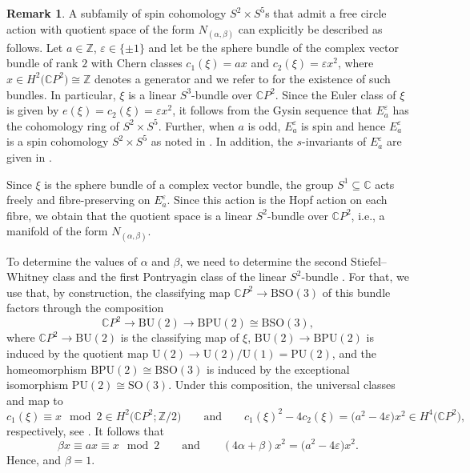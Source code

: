 \documentclass[10pt,a4paper]{amsart}
\numberwithin{equation}{section}
\theoremstyle{definition}
\newtheorem{Remark}[Theorem]{Remark}
\numberwithin{table}{section}
\newcommand{\Z}{\mathbb{Z}}
\newcommand{\C}{\mathbb{C}}
\begin{document}
\begin{Remark}
	A subfamily of spin cohomology $S^2\times S^5$s that admit a free circle action with quotient space of the form $N_{(\alpha,\beta)}$ can explicitly be described as follows. Let $a\in\Z$, $\varepsilon\in\{\pm1\}$ and let \smash{$E_a^\varepsilon\xrightarrow{\xi}\C P^2$} be the sphere bundle of the complex vector bundle of rank $2$ with Chern classes $c_1(\xi)=a x$ and $c_2(\xi)=\varepsilon x^2$, where $x\in H^2\bigl(\C P^2\bigr)\cong\Z$ denotes a generator and we refer to \cite[Theorem A]{Th74} for the existence of such bundles. In particular, $\xi$ is a linear $S^3$-bundle over $\C P^2$. Since the Euler class of $\xi$ is given by $e(\xi)=c_2(\xi)=\varepsilon x^2$, it follows from the Gysin sequence that $E_a^\varepsilon$ has the cohomology ring of $S^2\times S^5$. Further, when $a$ is odd, $E_a^\varepsilon$ is spin and hence $E_a^\varepsilon$ is a spin cohomology $S^2\times S^5$ as noted in \cite[Section 5]{KS25}. In addition, the $s$-invariants of $E_a^\varepsilon$ are given in \cite[(5.4)]{KS25}.
	
	Since $\xi$ is the sphere bundle of a complex vector bundle, the group $S^1\subseteq\C$ acts freely and fibre-preserving on $E_a^\varepsilon$. Since this action is the Hopf action on each fibre, we obtain that the quotient space is a linear $S^2$-bundle over $\C P^2$, i.e., a manifold of the form $N_{(\alpha,\beta)}$.
	
	To determine the values of $\alpha$ and $\beta$, we need to determine the second Stiefel--Whitney class and the first Pontryagin class of the linear $S^2$-bundle \smash{$N_{(\alpha,\beta)}\to\C P^2$}. For that, we use that, by construction, the classifying map $\C P^2\to\mathrm{BSO}(3)$ of this bundle factors through the composition
	\[ \C P^2\to\mathrm{BU}(2)\to\mathrm{BPU}(2)\cong\mathrm{BSO}(3), \]
	where $\C P^2\to\mathrm{BU}(2)$ is the classifying map of $\xi$, $\mathrm{BU}(2)\to\mathrm{BPU}(2)$ is induced by the quotient map $\mathrm{U}(2)\to\mathrm{U}(2)/\mathrm{U}(1)=\mathrm{PU}(2)$, and the homeomorphism $\mathrm{BPU}(2)\cong\mathrm{BSO}(3)$ is induced by the exceptional isomorphism $\mathrm{PU}(2)\cong\mathrm{SO}(3)$. Under this composition, the universal classes \smash{$w_2\in H^2(\mathrm{BSO}(3);\Z/2)$} and  map to
	\[c_1(\xi)\equiv x\mod 2\in H^2\bigl(\C P^2;\Z/2\bigr)\qquad
\text{and}\qquad c_1(\xi)^2-4c_2(\xi)= \bigl(a^2-4\varepsilon\bigr)x^2\in H^4\bigl(\C P^2\bigr), \]
	respectively, see \cite[Lemma~3.2]{AW14}. It follows that
	\[ \beta x\equiv  ax\equiv x\mod 2 \qquad
	\text{and}\qquad  (4\alpha+\beta)x^2=\bigl(a^2-4\varepsilon\bigr)x^2. \]
	Hence,  and $\beta=1$.
\end{Remark}
\end{document}
